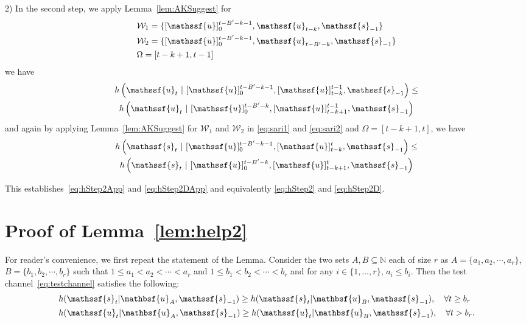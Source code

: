 \documentclass[journal, twocolumn, 10pt]{IEEEtran}
\newcommand{\cW}{{\mathcal{W}}}
\newcommand{\rvs}{{\mathssf{s}}}    %
\newcommand{\rvu}{{\mathssf{u}}}    %
\newcommand{\rvbu}{{\mathbsf{u}}}
\begin{document}
{%
2) In the second step, we apply Lemma~\ref{lem:AKSuggest} for 
\begin{align}
&\cW_{1}=  \{[\rvu]_{0}^{t-B'-k-1},\rvu_{t-k}, \rvs_{-1} \}\label{eq:sari1}\\
&\cW_{2}=  \{[\rvu]_{0}^{t-B'-k-1},\rvu_{t-B'-k}, \rvs_{-1} \}\label{eq:sari2}\\
& \Omega = [t-k+1,t-1]
\end{align} we have 
\begin{multline}
h\left(\rvu_{t}~|~[\rvu]_{0}^{t-B'-k-1},[\rvu]_{t-k}^{t-1},\rvs_{-1}\right) \le \\   h\left(\rvu_{t}~|~[\rvu]_{0}^{t-B'-k},[\rvu]_{t-k+1}^{t-1},\rvs_{-1}\right) 
\end{multline} and again by applying Lemma~\ref{lem:AKSuggest} for $\cW_{1}$ and $\cW_{2}$ in \eqref{eq:sari1} and \eqref{eq:sari2} and $\Omega = [t-k+1,t]$, we have 
\begin{multline}
h\left(\rvs_{t}~|~[\rvu]_{0}^{t-B'-k-1},[\rvu]_{t-k}^{t},\rvs_{-1}\right) \le \\ h\left(\rvs_{t}~|~[\rvu]_{0}^{t-B'-k},[\rvu]_{t-k+1}^{t},\rvs_{-1}\right)\label{aftercritD} 
\end{multline} 

This establishes~\eqref{eq:hStep2App} and \eqref{eq:hStep2DApp} and equivalently \eqref{eq:hStep2} and \eqref{eq:hStep2D}.


\section{Proof of Lemma~\ref{lem:help2}}
\label{App:help2}

{For reader's convenience, we first repeat the statement of the Lemma. Consider the two sets $A, B\subseteq \mathbb{N}$ each of size $r$ as $A=\{a_{1},a_{2},\cdots,a_{r}\}$, $B=\{b_{1},b_{2},\cdots,b_{r}\}$ such that $1\le a_1<a_2<\cdots<a_r$ and $1\le b_1<b_2<\cdots<b_r$ and for any $i \in \{1,\ldots,r\}$, $a_{i} \le b_{i}$. Then the test channel~\eqref{eq:testchannel} satisfies the following: 
\begin{align}
&h(\rvs_{t}|\rvbu_{A},\rvs_{-1}) \ge h(\rvs_{t}|\rvbu_{B},\rvs_{-1}), \quad \forall t \ge b_r \label{eq:lem2-help2App}\\
&h(\rvu_{t}|\rvbu_{A},\rvs_{-1}) \ge h(\rvu_{t}|\rvbu_{B},\rvs_{-1}), \quad \forall t > b_r \label{eq:lem1-help2App}. 
\end{align}
}  
 
}
\end{document}
